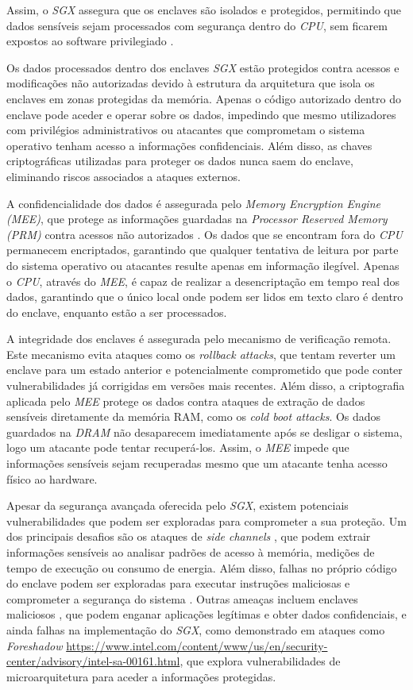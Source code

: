 \documentclass[a4paper,12pt]{article}
\begin{document}
Assim, o \textit{SGX} assegura que os enclaves são isolados e protegidos, permitindo que dados sensíveis sejam processados com segurança dentro do \textit{CPU}, sem ficarem expostos ao software privilegiado \cite{link}.

Os dados processados dentro dos enclaves \textit{SGX} estão protegidos contra acessos e modificações não autorizadas devido à estrutura da arquitetura que isola os enclaves em zonas protegidas da memória. Apenas o código autorizado dentro do enclave pode aceder e operar sobre os dados, impedindo que mesmo utilizadores com privilégios administrativos ou atacantes que comprometam o sistema operativo tenham acesso a informações confidenciais. Além disso, as chaves criptográficas utilizadas para proteger os dados nunca saem do enclave, eliminando riscos associados a ataques externos.

A confidencialidade dos dados é assegurada pelo \textit{Memory Encryption Engine (MEE)}, que protege as informações guardadas na \textit{Processor Reserved Memory (PRM)} contra acessos não autorizados \cite{link}. Os dados que se encontram fora do \textit{CPU} permanecem encriptados, garantindo que qualquer tentativa de leitura por parte do sistema operativo ou atacantes resulte apenas em informação ilegível. Apenas o \textit{CPU}, através do \textit{MEE}, é capaz de realizar a desencriptação em tempo real dos dados, garantindo que o único local onde podem ser lidos em texto claro é dentro do enclave, enquanto estão a ser processados.

A integridade dos enclaves é assegurada pelo mecanismo de verificação remota. Este mecanismo evita ataques como os \textit{rollback attacks}, que tentam reverter um enclave para um estado anterior e potencialmente comprometido que pode conter vulnerabilidades já corrigidas em versões mais recentes. Além disso, a criptografia aplicada pelo \textit{MEE} protege os dados contra ataques de extração de dados sensíveis diretamente da memória RAM, como os \textit{cold boot attacks}. Os dados guardados na \textit{DRAM} não desaparecem imediatamente após se desligar o sistema, logo um atacante pode tentar recuperá-los. Assim, o \textit{MEE} impede que informações sensíveis sejam recuperadas mesmo que um atacante tenha acesso físico ao hardware. 

Apesar da segurança avançada oferecida pelo \textit{SGX}, existem potenciais vulnerabilidades que podem ser exploradas para comprometer a sua proteção. Um dos principais desafios são os ataques de \textit{side channels} \cite{Brasser2017}, que podem extrair informações sensíveis ao analisar padrões de acesso à memória, medições de tempo de execução ou consumo de energia. Além disso, falhas no próprio código do enclave podem ser exploradas para executar instruções maliciosas e comprometer a segurança do sistema \cite{Schwarz2019}. Outras ameaças incluem enclaves maliciosos \cite{Aumasson2016}, que podem enganar aplicações legítimas e obter dados confidenciais, e ainda falhas na implementação do \textit{SGX}, como demonstrado em ataques como \textit{Foreshadow} \cite{foreshadow} \url{https://www.intel.com/content/www/us/en/security-center/advisory/intel-sa-00161.html}, que explora vulnerabilidades de microarquitetura para aceder a informações protegidas.
\end{document}
